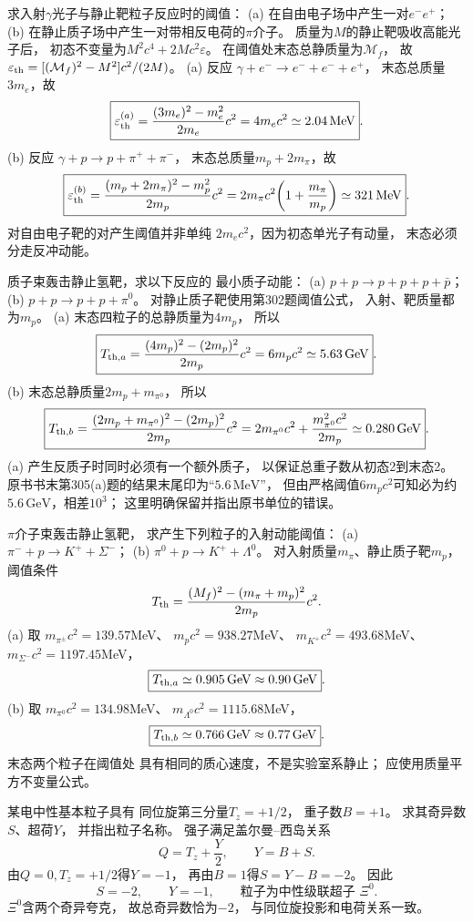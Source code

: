 求入射$\gamma$光子与静止靶粒子反应时的阈值：
(a) 在自由电子场中产生一对$e^-e^+$；
(b) 在静止质子场中产生一对带相反电荷的$\pi$介子。
\exsolution
质量为$M$的静止靶吸收高能光子后，
初态不变量为$M^2c^4+2Mc^2\varepsilon$。
在阈值处末态总静质量为$\mathcal M_f$，
故
$\varepsilon_{\rm th}=
[(\mathcal M_f)^2-M^2]c^2/(2M)$。
(a) 反应
$\gamma+e^-\to e^-+e^-+e^+$，
末态总质量$3m_e$，故
\[
 \boxed{\varepsilon_{\rm th}^{(a)}
 =\frac{(3m_e)^2-m_e^2}{2m_e}c^2
 =4m_ec^2\simeq2.04\,\mathrm{MeV}}.
\]
(b) 反应
$\gamma+p\to p+\pi^++\pi^-$，
末态总质量$m_p+2m_\pi$，故
\[
 \boxed{\varepsilon_{\rm th}^{(b)}=
 \frac{(m_p+2m_\pi)^2-m_p^2}{2m_p}c^2
 =2m_\pi c^2\!\left(1+\frac{m_\pi}{m_p}\right)
 \simeq321\,\mathrm{MeV}}.
\]
\excheck 对自由电子靶的对产生阈值并非单纯
$2m_ec^2$，因为初态单光子有动量，
末态必须分走反冲动能。

质子束轰击静止氢靶，求以下反应的
最小质子动能：
(a) $p+p\to p+p+p+\bar p$；
(b) $p+p\to p+p+\pi^0$。
\exsolution
对静止质子靶使用第302题阈值公式，
入射、靶质量都为$m_p$。
(a) 末态四粒子的总静质量为$4m_p$，
所以
\[
 \boxed{T_{{\rm th},a}=
 \frac{(4m_p)^2-(2m_p)^2}{2m_p}c^2
 =6m_pc^2\simeq5.63\,\mathrm{GeV}}.
\]
(b) 末态总静质量$2m_p+m_{\pi^0}$，
所以
\[
 \boxed{T_{{\rm th},b}=
 \frac{(2m_p+m_{\pi^0})^2-(2m_p)^2}{2m_p}c^2
 =2m_{\pi^0}c^2+\frac{m_{\pi^0}^2c^2}{2m_p}
 \simeq0.280\,\mathrm{GeV}}.
\]
\excheck (a) 产生反质子时同时必须有一个额外质子，
以保证总重子数从初态2到末态2。
原书书末第305(a)题的结果末尾印为“$5.6\,\mathrm{MeV}$”，
但由严格阈值$6m_pc^2$可知必为约
$5.6\,\mathrm{GeV}$，相差$10^3$；
这里明确保留并指出原书单位的错误。

$\pi$介子束轰击静止氢靶，
求产生下列粒子的入射动能阈值：
(a) $\pi^-+p\to K^++\Sigma^-$；
(b) $\pi^0+p\to K^++\Lambda^0$。
\exsolution
对入射质量$m_\pi$、静止质子靶$m_p$，
阈值条件
\[
 T_{\rm th}=
 \frac{(M_f)^2-(m_\pi+m_p)^2}{2m_p}c^2.
\]
(a) 取
$m_{\pi^\pm}c^2=139.57$MeV、
$m_pc^2=938.27$MeV、
$m_{K^+}c^2=493.68$MeV、
$m_{\Sigma^-}c^2=1197.45$MeV，
\[
 \boxed{T_{{\rm th},a}\simeq0.905\,\mathrm{GeV}
 \approx0.90\,\mathrm{GeV}}.
\]
(b) 取
$m_{\pi^0}c^2=134.98$MeV、
$m_{\Lambda^0}c^2=1115.68$MeV，
\[
 \boxed{T_{{\rm th},b}\simeq0.766\,\mathrm{GeV}
 \approx0.77\,\mathrm{GeV}}.
\]
\excheck 末态两个粒子在阈值处
具有相同的质心速度，不是实验室系静止；
应使用质量平方不变量公式。

某电中性基本粒子具有
同位旋第三分量$T_z=+1/2$，
重子数$B=+1$。
求其奇异数$S$、超荷$Y$，
并指出粒子名称。
\exsolution
强子满足盖尔曼--西岛关系
\[
 Q=T_z+\frac{Y}{2},\qquad Y=B+S.
\]
由$Q=0,T_z=+1/2$得$Y=-1$，
再由$B=1$得$S=Y-B=-2$。
因此
\[
 \boxed{S=-2,\qquad Y=-1},\qquad
 \boxed{\text{粒子为中性级联超子 }\Xi^0}.
\]
\excheck $\Xi^0$含两个奇异夸克，
故总奇异数恰为$-2$，
与同位旋投影和电荷关系一致。

